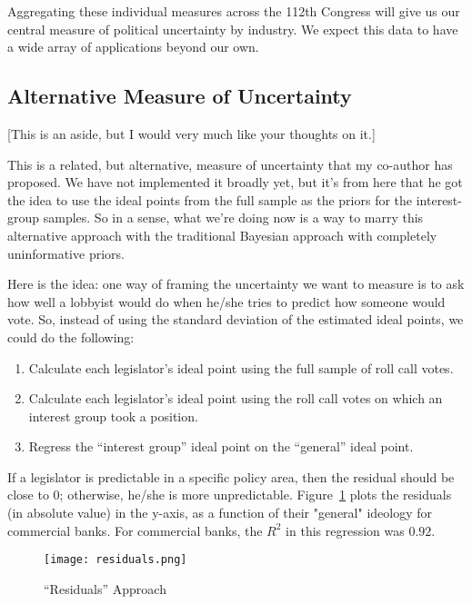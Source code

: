 \documentclass[12pt]{article}
\begin{document}
Aggregating these individual measures across the 112th Congress will give us our central measure of political uncertainty by industry. We expect this data to have a wide array of applications beyond our own.

\subsection{Alternative Measure of Uncertainty}
[This is an aside, but I would very much like your thoughts on it.]

This is a related, but alternative, measure of uncertainty that my co-author has proposed. We have not implemented it broadly yet, but it's from here that he got the idea to use the ideal points from the full sample as the priors for the interest-group samples. So in a sense, what we're doing now is a way to marry this alternative approach with the traditional Bayesian approach with completely uninformative priors.

Here is the idea: one way of framing the uncertainty we want to measure is to ask how well a lobbyist would do when he/she tries to predict how someone would vote. So, instead of using the standard deviation of the estimated ideal points, we could do the following:

\begin{enumerate}
	\item Calculate each legislator's ideal point using the full sample of roll call votes.
	\item Calculate each legislator's ideal point using the roll call votes on which an interest group took a position.
	\item Regress the ``interest group'' ideal point on the ``general'' ideal point.
\end{enumerate}

If a legislator is predictable in a specific policy area, then the residual should be close to 0; otherwise, he/she is more unpredictable. Figure~\ref{fig:br} plots the residuals (in absolute value) in the y-axis, as a function of their "general" ideology for commercial banks. For commercial banks, the $R^2$ in this regression was $0.92$. 

\begin{figure}
\begin{center}
\texttt{[image: residuals.png]}
\end{center}
\caption{``Residuals'' Approach\label{fig:br}}
\end{figure}
\end{document}
